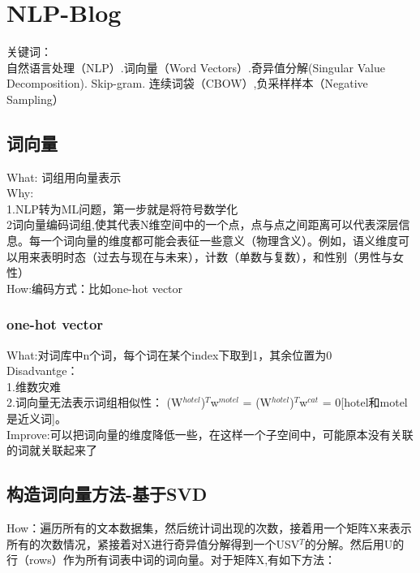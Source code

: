 \documentclass[
10pt, %
a4paper, %
oneside, %
headinclude,footinclude, %
BCOR5mm, %
]{scrartcl}
\begin{document}


\newpage %




\section{NLP-Blog}
关键词：\\\indent 自然语言处理（NLP）.词向量（Word Vectors）.奇异值分解(Singular Value Decomposition). Skip-gram. 连续词袋（CBOW）,负采样样本（Negative Sampling）
\subsection{\color{red}词向量}
What: 词组用向量表示
\\Why:\\\indent1.NLP转为ML问题，第一步就是将符号数学化\\\indent2词向量编码词组,使其代表N维空间中的一个点，点与点之间距离可以代表深层信息。每一个词向量的维度都可能会表征一些意义（物理含义）。例如，语义维度可以用来表明时态（过去与现在与未来），计数（单数与复数），和性别（男性与女性）
\\How:编码方式：比如one-hot vector
\subsubsection{\color{blue}one-hot vector}
What:对词库中n个词，每个词在某个index下取到1，其余位置为0
\\Disadvantge：\\\indent1.维数灾难\\\indent2.词向量无法表示词组相似性： (W$^{hotel}$)$^T$w$^{motel}$ = (W$^{hotel}$)$^T$w$^{cat}$ = 0[hotel和motel是近义词]。
\\Improve:可以把词向量的维度降低一些，在这样一个子空间中，可能原本没有关联的词就关联起来了
\subsection{\color{red}构造词向量方法-基于SVD}
How：遍历所有的文本数据集，然后统计词出现的次数，接着用一个矩阵X来表示所有的次数情况，紧接着对X进行奇异值分解得到一个USV$^T$的分解。然后用U的行（rows）作为所有词表中词的词向量。对于矩阵X,有如下方法：
\end{document}
